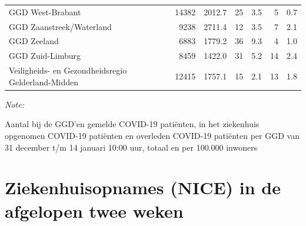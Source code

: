 \documentclass[
  english,
  man,floatsintext]{apa6}
\begin{document}
\begin{table}
\begin{threeparttable}
\begin{tabular}{lrrrrrr}
GGD West-Brabant & 14382 & 2012.7 & 25 & 3.5 & 5 & 0.7\\
GGD Zaanstreek/Waterland & 9238 & 2711.4 & 12 & 3.5 & 7 & 2.1\\
GGD Zeeland & 6883 & 1779.2 & 36 & 9.3 & 4 & 1.0\\
GGD Zuid-Limburg & 8459 & 1422.0 & 31 & 5.2 & 14 & 2.4\\
Veiligheids- en Gezondheidsregio Gelderland-Midden & 12415 & 1757.1 & 15 & 2.1 & 13 & 1.8\\
\bottomrule
\end{tabular}
\begin{tablenotes}
\item \textit{Note: } 
\item Aantal bij de GGD’en gemelde COVID-19 patiënten, in het ziekenhuis opgenomen COVID-19 patiënten en overleden COVID-19 patiënten per GGD van 31 december t/m 14 januari 10:00 uur, totaal en per 100.000 inwoners
\end{tablenotes}
\end{threeparttable}
\endgroup{}
\end{table}

\newpage

\hypertarget{ziekenhuisopnames-nice-in-de-afgelopen-twee-weken}{%
\section{Ziekenhuisopnames (NICE) in de afgelopen twee weken}\label{ziekenhuisopnames-nice-in-de-afgelopen-twee-weken}}
\end{document}
